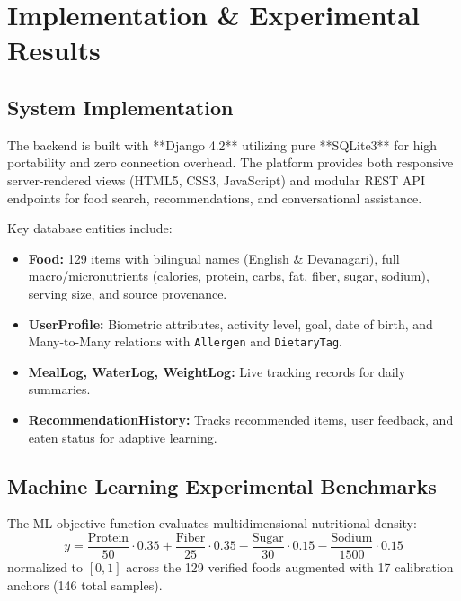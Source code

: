 \documentclass[12pt,a4paper]{report}
\begin{document}
\chapter{Implementation \& Experimental Results}

\section{System Implementation}

The backend is built with **Django 4.2** utilizing pure **SQLite3** for high portability and zero connection overhead. The platform provides both responsive server-rendered views (HTML5, CSS3, JavaScript) and modular REST API endpoints for food search, recommendations, and conversational assistance.

Key database entities include:
\begin{itemize}
  \item \textbf{Food:} 129 items with bilingual names (English \& Devanagari), full macro/micronutrients (calories, protein, carbs, fat, fiber, sugar, sodium), serving size, and source provenance.
  \item \textbf{UserProfile:} Biometric attributes, activity level, goal, date of birth, and Many-to-Many relations with \texttt{Allergen} and \texttt{DietaryTag}.
  \item \textbf{MealLog, WaterLog, WeightLog:} Live tracking records for daily summaries.
  \item \textbf{RecommendationHistory:} Tracks recommended items, user feedback, and eaten status for adaptive learning.
\end{itemize}

\section{Machine Learning Experimental Benchmarks}

The ML objective function evaluates multidimensional nutritional density:
\begin{equation}
  y = \frac{\text{Protein}}{50} \cdot 0.35 + \frac{\text{Fiber}}{25} \cdot 0.35 - \frac{\text{Sugar}}{30} \cdot 0.15 - \frac{\text{Sodium}}{1500} \cdot 0.15
\end{equation}
normalized to $[0, 1]$ across the 129 verified foods augmented with 17 calibration anchors (146 total samples).
\end{document}
